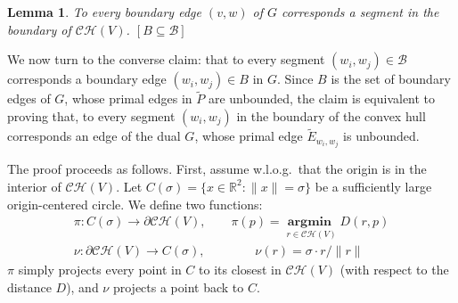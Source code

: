 \documentclass[11pt]{article}
\newtheorem{lemma}[theorem]{Lemma}
\begin{document}
\begin{lemma}\label{boundary_easy}
To every boundary edge $(v,w)$ of $G$ corresponds a segment in the boundary of $\mathcal{CH}(V)$. \emph{$[B\subseteq\mathcal{B}]$}
\end{lemma}





We now turn to the converse claim: that to every segment 
$(w_i,w_j)\in\mathcal{B}$ corresponds a boundary edge
$(w_i,w_j)\in B$ in $G$. Since $B$ is the set of boundary edges of $G$, whose primal edges in
$\tilde{P}$ are
unbounded, the claim is equivalent to proving that, to every segment
$(w_i,w_j)$ in the boundary of the convex hull corresponds an edge of the
dual $G$, whose primal edge $\tilde{E}_{w_i,w_j}$ is unbounded. 


The proof proceeds as follows. First, assume w.l.o.g.\  that the origin is in the interior of $\mathcal{CH}(V)$. 
Let  $C(\sigma)=\{x\in\mathbb{R}^2 : \|x\|=\sigma\}$ be a sufficiently large origin-centered circle. 
We define two  functions: 
\begin{eqnarray*}
	\pi : C(\sigma)\rightarrow\partial\mathcal{CH}(V),   \text{  }\text{  }\text{  }   \pi(p) = \underset{r\in\mathcal{CH}(V)}{\operatorname{\mathbf{argmin\ }}} D(r,p) \\
	\nu : \partial\mathcal{CH}(V)\rightarrow C(\sigma), \text{  }\text{  }\text{  }\text{  }\text{  }\text{  }    \nu(r) =  \sigma \cdot r / \|r\|
\end{eqnarray*}
$\pi$ simply projects every point in $C$ to its closest in $\mathcal{CH}(V)$ (with respect to the distance $D$), 
and $\nu$ projects a point back to $C$. 
\end{document}
